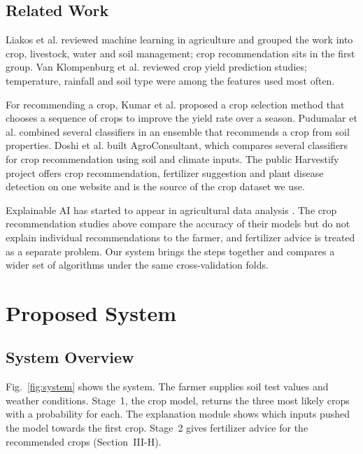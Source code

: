 \documentclass[conference]{IEEEtran}
\begin{document}
\subsection{Related Work}

Liakos et al. \cite{liakos2018} reviewed machine learning in agriculture and grouped the work into crop, livestock, water and soil management; crop recommendation sits in the first group. Van Klompenburg et al. \cite{vanklompenburg2020} reviewed crop yield prediction studies; temperature, rainfall and soil type were among the features used most often.

For recommending a crop, Kumar et al. \cite{kumar2015} proposed a crop selection method that chooses a sequence of crops to improve the yield rate over a season. Pudumalar et al. \cite{pudumalar2017} combined several classifiers in an ensemble that recommends a crop from soil properties. Doshi et al. \cite{doshi2018} built AgroConsultant, which compares several classifiers for crop recommendation using soil and climate inputs. The public Harvestify project \cite{harvestify} offers crop recommendation, fertilizer suggestion and plant disease detection on one website and is the source of the crop dataset we use.

Explainable AI has started to appear in agricultural data analysis \cite{ryo2022}. The crop recommendation studies above compare the accuracy of their models but do not explain individual recommendations to the farmer, and fertilizer advice is treated as a separate problem. Our system brings the steps together and compares a wider set of algorithms under the same cross-validation folds.

\section{Proposed System}

\subsection{System Overview}

Fig.~\ref{fig:system} shows the system. The farmer supplies soil test values and weather conditions. Stage~1, the crop model, returns the three most likely crops with a probability for each. The explanation module shows which inputs pushed the model towards the first crop. Stage~2 gives fertilizer advice for the recommended crops (Section~III-H).
\end{document}
